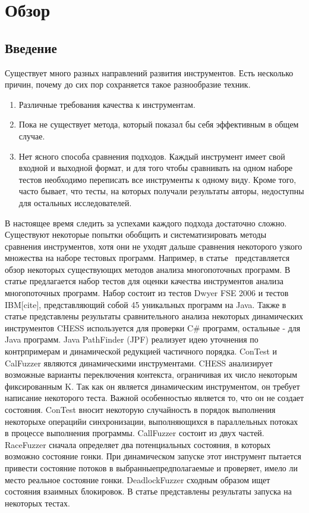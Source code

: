 \chapter{Обзор}
\label{chapter_related_work}

\section{Введение}
\label{rw:introduction}


Существует много разных направлений развития инструментов. 
Есть несколько причин, почему до сих пор сохраняется такое разнообразие техник.
\begin{enumerate}
\item Различные требования качества к инструментам.
\item Пока не существует метода, который показал бы себя эффективным в общем случае. 
\item Нет ясного способа сравнения подходов. Каждый инструмент имеет свой входной и выходной формат, и для того чтобы сравнивать на одном наборе тестов необходимо переписать все инструменты к одному виду. Кроме того, часто бывает, что тесты, на которых получали результаты авторы, недоступны для остальных исследователей.
\end{enumerate}
В настоящее время следить за успехами каждого подхода достаточно сложно. Существуют некоторые попытки обобщить и систематизировать методы сравнения инструментов, хотя они не уходят дальше сравнения некоторого узкого множества на наборе тестовых программ. Например, в статье~\cite{Rungta:2009} представляется обзор некоторых существующих методов анализа многопоточных программ.
В статье предлагается набор тестов для оценки качества инструментов анализа многопоточных программ. Набор состоит из тестов Dwyer FSE 2006 и тестов IBM[cite], представляющий собой 45 уникальных программ на Java. Также в статье представлены результаты сравнительного анализа некоторых динамических инструментов %
CHESS используется для проверки C\# программ, остальные - для Java программ. Java PathFinder (JPF) реализует идею уточнения по контрпримерам и динамической редукцией частичного порядка. ConTest и CalFuzzer являются динамическими инструментами. 
CHESS анализирует возможные варианты переключения контекста, ограничивая их число некоторым фиксированным K. Так как он является динамическим инструментом, он требует написание некоторого теста. Важной особенностью является то, что он не создает состояния.
ConTest вносит некоторую случайность в порядок выполнения некоторыхе операцийи синхронизации, выполняющихся в параллельных потоках в процессе выполнения программы.
CallFuzzer состоит из двух частей. RaceFuzzer сначала определяет два потенциальных состояния, в которых возможно состояние гонки. При динамическом запуске этот инструмент пытается привести состояние потоков в выбранныепредполагаемые и проверяет, имело ли место реальное состояние гонки. DeadlockFuzzer сходным образом ищет состояния взаимных блокировок.
В статье представлены результаты запуска на некоторых тестах.

